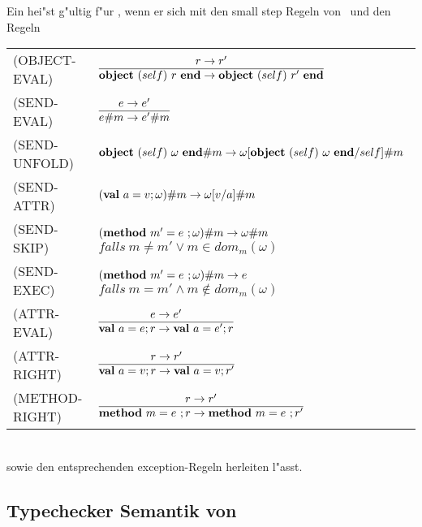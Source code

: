 Ein  hei"st g"ultig f"ur \LTWOO, wenn er sich mit den small step Regeln von \LTWO\ und den Regeln\\[5mm]
  \begin{tabular}{ll}
    \mbox{(OBJECT-EVAL)}    & $\regel{r \to r'}
                                     {\object{self}{r} \to \object{self}{r'}}$ \\[5mm]
    \mbox{(SEND-EVAL)}      & $\regel{e \to e'}
                                     {\send{e}{m} \to \send{e'}{m}}$ \\[5mm]
    \mbox{(SEND-UNFOLD)}    & $\textbf{object}\ (self)\ \omega\ \textbf{end} \# m \to 
                               \omega [\textbf{object}\ (self)\ \omega\ \textbf{end}/self] \# m$ \\[3mm]
    \mbox{(SEND-ATTR)}      & $(\textbf{val}\ a=v;\omega) \# m \to \omega [v/a] \# m$ \\[3mm]
    \mbox{(SEND-SKIP)}      & $(\textbf{method}\ m'=e\ ;\omega) \# m \to \omega \# m$ \ 
                              $falls\ m \neq m' \vee m \in dom_m(\omega)$ \\[3mm]
    \mbox{(SEND-EXEC)}      & $(\textbf{method}\ m'=e\ ;\omega) \# m \to e$ \ 
                              $falls\ m = m' \wedge m \notin dom_m(\omega)$ \\[3mm]
    \mbox{(ATTR-EVAL)}      & $\regel{e \to e'}
                                     {\val{a}{e}r \to \val{a}{e'}r}$ \\[5mm]
    \mbox{(ATTR-RIGHT)}     & $\regel{r \to r'}
                                     {\val{a}{v}r \to \val{a}{v}r'}$ \\[5mm]
    \mbox{(METHOD-RIGHT)}   & $\regel{r \to r'}
                                     {\method{m}{e}r \to \method{m}{e}r'}$
  \end{tabular}\\[7mm]
sowie den entsprechenden exception-Regeln herleiten l"asst.


\subsection{Typechecker Semantik von \LTWOO}

